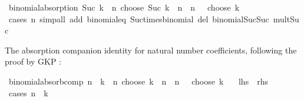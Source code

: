 \begin{isabellebody}
\begin{isamarkuptext}
\end{isamarkuptext}\isamarkuptrue%
\isamarkupfalse%
\ binomial{\isacharunderscore}{\kern0pt}absorption{\isacharcolon}{\kern0pt}\ {\isachardoublequoteopen}Suc\ k\ {\isacharasterisk}{\kern0pt}\ {\isacharparenleft}{\kern0pt}n\ choose\ Suc\ k{\isacharparenright}{\kern0pt}\ {\isacharequal}{\kern0pt}\ n\ {\isacharasterisk}{\kern0pt}\ {\isacharparenleft}{\kern0pt}{\isacharparenleft}{\kern0pt}n\ {\isacharminus}{\kern0pt}\ {}{\isacharparenright}{\kern0pt}\ choose\ k{\isacharparenright}{\kern0pt}{\isachardoublequoteclose}\isanewline
%
\isadelimproof
\ \ %
\endisadelimproof
%
\isatagproof
{}\isamarkupfalse%
\ {\isacharparenleft}{\kern0pt}cases\ n{\isacharparenright}{\kern0pt}\ {\isacharparenleft}{\kern0pt}simp{\isacharunderscore}{\kern0pt}all\ add{\isacharcolon}{\kern0pt}\ binomial{\isacharunderscore}{\kern0pt}eq{\isacharunderscore}{\kern0pt}{}\ Suc{\isacharunderscore}{\kern0pt}times{\isacharunderscore}{\kern0pt}binomial\ del{\isacharcolon}{\kern0pt}\ binomial{\isacharunderscore}{\kern0pt}Suc{\isacharunderscore}{\kern0pt}Suc\ mult{\isacharunderscore}{\kern0pt}Suc{\isacharparenright}{\kern0pt}%
\endisatagproof
{\isafoldproof}%
%
\isadelimproof
%
\endisadelimproof
%
\begin{isamarkuptext}%
The absorption companion identity for natural number coefficients,
  following the proof by GKP \cite[p.~157]{GKP_CM}:%
\end{isamarkuptext}\isamarkuptrue%
\isamarkupfalse%
\ binomial{\isacharunderscore}{\kern0pt}absorb{\isacharunderscore}{\kern0pt}comp{\isacharcolon}{\kern0pt}\ {\isachardoublequoteopen}{\isacharparenleft}{\kern0pt}n\ {\isacharminus}{\kern0pt}\ k{\isacharparenright}{\kern0pt}\ {\isacharasterisk}{\kern0pt}\ {\isacharparenleft}{\kern0pt}n\ choose\ k{\isacharparenright}{\kern0pt}\ {\isacharequal}{\kern0pt}\ n\ {\isacharasterisk}{\kern0pt}\ {\isacharparenleft}{\kern0pt}{\isacharparenleft}{\kern0pt}n\ {\isacharminus}{\kern0pt}\ {}{\isacharparenright}{\kern0pt}\ choose\ k{\isacharparenright}{\kern0pt}{\isachardoublequoteclose}\isanewline
\ \ {\isacharparenleft}{\kern0pt}\ {\isachardoublequoteopen}{\isacharquery}{\kern0pt}lhs\ {\isacharequal}{\kern0pt}\ {\isacharquery}{\kern0pt}rhs{\isachardoublequoteclose}{\isacharparenright}{\kern0pt}\isanewline
%
\isadelimproof
%
\endisadelimproof
%
\isatagproof
{}\isamarkupfalse%
\ {\isacharparenleft}{\kern0pt}cases\ {\isachardoublequoteopen}n\ {\isasymle}\ k{\isachardoublequoteclose}{\isacharparenright}{\kern0pt}\isanewline

\end{isabellebody}
